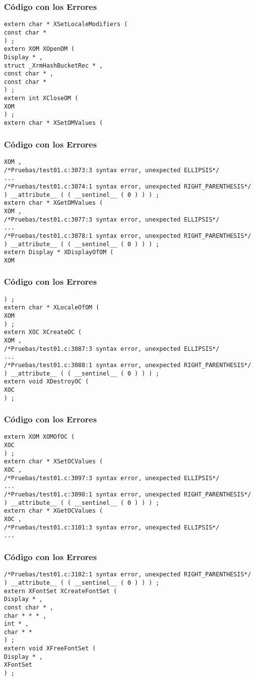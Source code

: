 \documentclass{beamer}
\begin{document}
\begin{frame}[fragile]
\frametitle{C\'odigo con los Errores}
\begin{verbatim}
extern char * XSetLocaleModifiers ( 
const char * 
) ; 
extern XOM XOpenOM ( 
Display * , 
struct _XrmHashBucketRec * , 
const char * , 
const char * 
) ; 
extern int XCloseOM ( 
XOM 
) ; 
extern char * XSetOMValues ( 
\end{verbatim}
\end{frame}
\begin{frame}[fragile]
\frametitle{C\'odigo con los Errores}
\begin{verbatim}
XOM , 
/*Pruebas/test01.c:3073:3 syntax error, unexpected ELLIPSIS*/
... 
/*Pruebas/test01.c:3074:1 syntax error, unexpected RIGHT_PARENTHESIS*/
) __attribute__ ( ( __sentinel__ ( 0 ) ) ) ; 
extern char * XGetOMValues ( 
XOM , 
/*Pruebas/test01.c:3077:3 syntax error, unexpected ELLIPSIS*/
... 
/*Pruebas/test01.c:3078:1 syntax error, unexpected RIGHT_PARENTHESIS*/
) __attribute__ ( ( __sentinel__ ( 0 ) ) ) ; 
extern Display * XDisplayOfOM ( 
XOM 
\end{verbatim}
\end{frame}
\begin{frame}[fragile]
\frametitle{C\'odigo con los Errores}
\begin{verbatim}
) ; 
extern char * XLocaleOfOM ( 
XOM 
) ; 
extern XOC XCreateOC ( 
XOM , 
/*Pruebas/test01.c:3087:3 syntax error, unexpected ELLIPSIS*/
... 
/*Pruebas/test01.c:3088:1 syntax error, unexpected RIGHT_PARENTHESIS*/
) __attribute__ ( ( __sentinel__ ( 0 ) ) ) ; 
extern void XDestroyOC ( 
XOC 
) ; 
\end{verbatim}
\end{frame}
\begin{frame}[fragile]
\frametitle{C\'odigo con los Errores}
\begin{verbatim}
extern XOM XOMOfOC ( 
XOC 
) ; 
extern char * XSetOCValues ( 
XOC , 
/*Pruebas/test01.c:3097:3 syntax error, unexpected ELLIPSIS*/
... 
/*Pruebas/test01.c:3098:1 syntax error, unexpected RIGHT_PARENTHESIS*/
) __attribute__ ( ( __sentinel__ ( 0 ) ) ) ; 
extern char * XGetOCValues ( 
XOC , 
/*Pruebas/test01.c:3101:3 syntax error, unexpected ELLIPSIS*/
... 
\end{verbatim}
\end{frame}
\begin{frame}[fragile]
\frametitle{C\'odigo con los Errores}
\begin{verbatim}
/*Pruebas/test01.c:3102:1 syntax error, unexpected RIGHT_PARENTHESIS*/
) __attribute__ ( ( __sentinel__ ( 0 ) ) ) ; 
extern XFontSet XCreateFontSet ( 
Display * , 
const char * , 
char * * * , 
int * , 
char * * 
) ; 
extern void XFreeFontSet ( 
Display * , 
XFontSet 
) ; 
\end{verbatim}
\end{frame}
\end{document}
